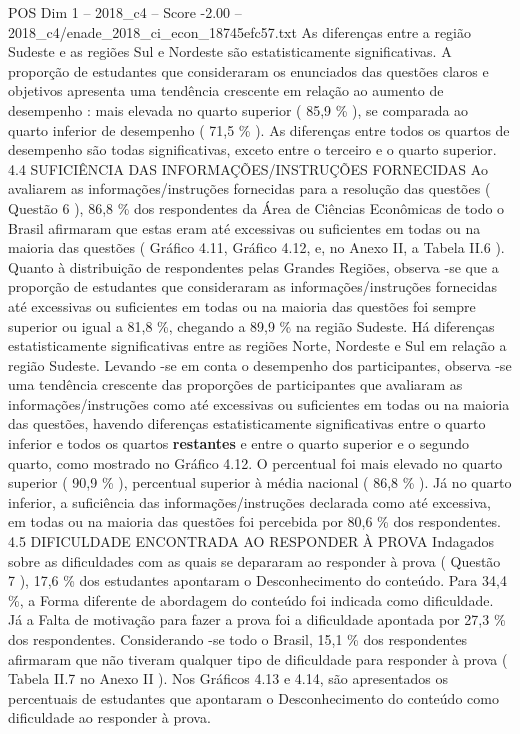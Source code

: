 \begin{textsample}{POS Dim 1 – 2018\_c4 – Score -2.00 – 2018\_c4/enade\_2018\_ci\_econ\_18745efc57.txt}
As diferenças entre a região Sudeste e as regiões Sul e Nordeste são estatisticamente significativas.
A proporção de estudantes que consideraram os enunciados das questões claros e objetivos apresenta uma tendência crescente em relação ao aumento de desempenho : mais elevada no quarto superior ( 85,9 \% ), se comparada ao quarto inferior de desempenho ( 71,5 \% ).
As diferenças entre todos os quartos de desempenho são todas significativas, exceto entre o terceiro e o quarto superior. 4.4 SUFICIÊNCIA DAS INFORMAÇÕES/INSTRUÇÕES FORNECIDAS Ao avaliarem as informações/instruções fornecidas para a resolução das questões ( Questão 6 ), 86,8 \% dos respondentes da Área de Ciências Econômicas de todo o Brasil afirmaram que estas eram até excessivas ou suficientes em todas ou na maioria das questões ( Gráfico 4.11, Gráfico 4.12, e, no Anexo II, a Tabela II.6 ).
Quanto à distribuição de respondentes pelas Grandes Regiões, observa -se que a proporção de estudantes que consideraram as informações/instruções fornecidas até excessivas ou suficientes em todas ou na maioria das questões foi sempre superior ou igual a 81,8 \%, chegando a 89,9 \% na região Sudeste.
Há diferenças estatisticamente significativas entre as regiões Norte, Nordeste e Sul em relação a região Sudeste.
Levando -se em conta o desempenho dos participantes, observa -se uma tendência crescente das proporções de participantes que avaliaram as informações/instruções como até excessivas ou suficientes em todas ou na maioria das questões, havendo diferenças estatisticamente significativas entre o quarto inferior e todos os quartos \textbf{restantes} e entre o quarto superior e o segundo quarto, como mostrado no Gráfico 4.12.
O percentual foi mais elevado no quarto superior ( 90,9 \% ), percentual superior à média nacional ( 86,8 \% ).
Já no quarto inferior, a suficiência das informações/instruções declarada como até excessiva, em todas ou na maioria das questões foi percebida por 80,6 \% dos respondentes. 4.5 DIFICULDADE ENCONTRADA AO RESPONDER À PROVA Indagados sobre as dificuldades com as quais se depararam ao responder à prova ( Questão 7 ), 17,6 \% dos estudantes apontaram o Desconhecimento do conteúdo.
Para 34,4 \%, a Forma diferente de abordagem do conteúdo foi indicada como dificuldade.
Já a Falta de motivação para fazer a prova foi a dificuldade apontada por 27,3 \% dos respondentes.
Considerando -se todo o Brasil, 15,1 \% dos respondentes afirmaram que não tiveram qualquer tipo de dificuldade para responder à prova ( Tabela II.7 no Anexo II ).
Nos Gráficos 4.13 e 4.14, são apresentados os percentuais de estudantes que apontaram o Desconhecimento do conteúdo como dificuldade ao responder à prova.

\end{textsample}
